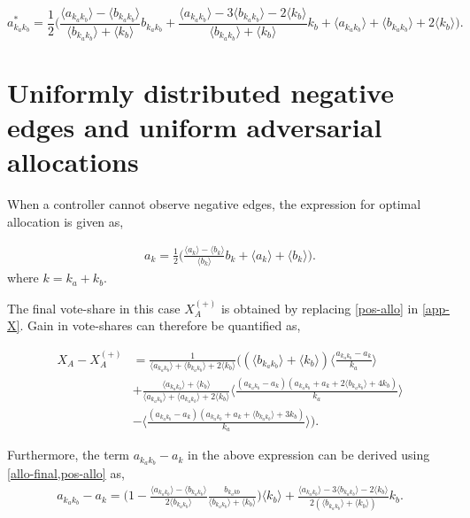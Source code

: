 \begin{equation}
        a_{k_{a}k_{b}}^* = \frac{1}{2} \Bigg( \frac{\langle a_{k_{a}k_{b}}\rangle - \langle b_{k_{a}k_{b}}\rangle}{\langle b_{k_{a}k_{b}} \rangle +\langle k_{b} \rangle}  b_{k_{a}k_{b}} + \frac{\langle a_{k_{a}k_{b}} \rangle - 3\langle b_{k_{a}k_{b}} \rangle -2 \langle k_{b} \rangle}{\langle b_{k_{a}k_{b}} \rangle +\langle k_{b} \rangle} k_{b} + \langle a_{k_{a}k_{b}}\rangle + \langle b_{k_{a}k_{b}}\rangle+2\langle k_{b} \rangle \Bigg).
  \label{allo-final}
\end{equation}


\section{Uniformly distributed negative edges and uniform adversarial allocations}
\label{gain0}

When a controller cannot observe negative edges, the expression for optimal allocation is given as,

\begin{align}
    a_{k} = \frac{1}{2} \Bigg( \frac{\langle a_{k}\rangle - \langle b_{k}\rangle}{\langle b_{k} \rangle}  b_{k} + \langle a_{k}\rangle + \langle b_{k}\rangle \Bigg).
    \label{pos-allo}
\end{align}
where $k = k_{a}+k_{b}$.

The final vote-share in this case $X_{A}^{(+)}$ is obtained by replacing \cref{pos-allo} in \cref{app-X}. 
Gain in vote-shares can therefore be quantified as, 

\begin{align*}
    X_{A} - X_{A}^{(+)} &= \frac{1}{\langle a_{k_{a}k_{b}} \rangle + \langle b_{k_{a}k_{b}} \rangle +2\langle k_{b} \rangle}\Big( (\langle b_{k_{a}k_{b}} \rangle+\langle k_{b} \rangle) \langle \frac{a_{k_{a}k_{b}}-a_{k}}{k_{a}} \rangle \\
    & + \frac{\langle a_{k_{a}k_{b}} \rangle +\langle k_{b} \rangle}{\langle a_{k_{a}k_{b}} \rangle + \langle a_{k_{a}k_{b}} \rangle + 2\langle k_{b} \rangle} \langle \frac{(a_{k_{a}k_{b}}-a_{k})(a_{k_{a}k_{b}}+a_{k}+2\langle b_{k_{a}k_{b}} \rangle+4k_{b})}{k_{a}} \rangle \\
    & - \langle \frac{(a_{k_{a}k_{b}}-a_{k})(a_{k_{a}k_{b}}+a_{k}+ \langle b_{k_{a}k_{b}} \rangle +3k_{b})}{k_{a}} \rangle \Big).
\end{align*}


Furthermore, the term $a_{k_{a}k_{b}} - a_{k}$ in the above expression can be derived using \cref{allo-final,pos-allo} as, 
\begin{align}
    a_{k_{a}k_{b}} - a_{k}  =  \Big( 1 - \frac{\langle a_{k_{a}k_{b}} \rangle - \langle b_{k_{a}k_{b}} \rangle }{2\langle b_{k_{a}k_{b}} \rangle}\frac{b_{k_{a}k{b}}}{\langle b_{k_{a}k_{b}} \rangle+\langle k_{b} \rangle} \Big) \langle k_{b} \rangle + \frac{\langle a_{k_{a}k_{b}} \rangle-3\langle b_{k_{a}k_{b}} \rangle-2\langle k_{b} \rangle}{2(\langle b_{k_{a}k_{b}} \rangle+\langle k_{b} \rangle)} k_{b}.
    \label{diff-allo}
\end{align}


